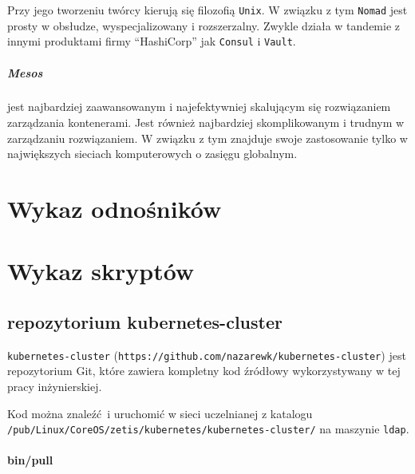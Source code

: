 \documentclass[a4paper,12pt,twoside,openany]{report}
\newcommand{\passthrough}[1]{#1}
\begin{document}
Przy jego tworzeniu twórcy kierują się filozofią
\passthrough{\lstinline!Unix!}. W związku z tym
\passthrough{\lstinline!Nomad!} jest prosty w obsłudze, wyspecjalizowany
i rozszerzalny. Zwykle działa w tandemie z innymi produktami firmy
``HashiCorp'' jak \passthrough{\lstinline!Consul!} i
\passthrough{\lstinline!Vault!}.

\hypertarget{mesos}{%
\paragraph{Mesos}\label{mesos}}

jest najbardziej zaawansowanym i najefektywniej skalującym się
rozwiązaniem zarządzania kontenerami. Jest również najbardziej
skomplikowanym i trudnym w zarządzaniu rozwiązaniem. W związku z tym
znajduje swoje zastosowanie tylko w największych sieciach komputerowych
o zasięgu globalnym. \appendix

\hypertarget{wykaz-odnoux15bnikuxf3w}{%
\chapter{Wykaz odnośników}\label{wykaz-odnoux15bnikuxf3w}}

\theendnotes

\hypertarget{wykaz-skryptuxf3w}{%
\chapter{Wykaz skryptów}\label{wykaz-skryptuxf3w}}

\hypertarget{repozytorium-kubernetes-cluster}{%
\section{repozytorium
kubernetes-cluster}\label{repozytorium-kubernetes-cluster}}

\passthrough{\lstinline!kubernetes-cluster!}
(\passthrough{\lstinline!https://github.com/nazarewk/kubernetes-cluster!})
jest repozytorium Git, które zawiera kompletny kod źródłowy
wykorzystywany w tej pracy inżynierskiej.

Kod można znaleźć~i uruchomić w sieci uczelnianej z katalogu
\passthrough{\lstinline!/pub/Linux/CoreOS/zetis/kubernetes/kubernetes-cluster/!}
na maszynie \passthrough{\lstinline!ldap!}.

\hypertarget{binpull}{%
\subsubsection{bin/pull}\label{binpull}}
\end{document}
